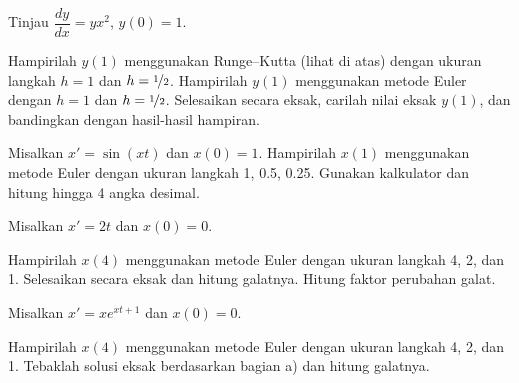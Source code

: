 \begin{exercise}
\pagebreak[2]
Tinjau $\dfrac{dy}{dx} = yx^2$, $y(0)=1$.
\begin{tasks}
\task Hampirilah $y(1)$
menggunakan Runge--Kutta (lihat di atas) dengan ukuran langkah $h=1$ dan
$h=\nicefrac{1}{2}$.
\task Hampirilah $y(1)$ menggunakan metode Euler dengan $h=1$ dan
$h=\nicefrac{1}{2}$.
\task Selesaikan secara eksak, carilah nilai eksak
$y(1)$, dan bandingkan dengan hasil-hasil hampiran.
\end{tasks}
\end{exercise}

\setcounter{exercise}{100}

\begin{exercise}
Misalkan $x' = \sin(xt)$ dan $x(0)=1$.
Hampirilah $x(1)$ menggunakan metode Euler dengan ukuran langkah 1, 0.5, 0.25.
Gunakan kalkulator dan hitung hingga 4 angka desimal.
\end{exercise}

\begin{exercise}
Misalkan $x' = 2t$ dan $x(0)=0$.
\begin{tasks}
\task Hampirilah $x(4)$ menggunakan metode Euler dengan ukuran langkah 4, 2, dan 1.
\task Selesaikan secara eksak dan hitung galatnya.
\task Hitung faktor perubahan galat.
\end{tasks}
\end{exercise}

\begin{samepage}
\begin{exercise}
Misalkan $x' = x e^{xt+1}$ dan $x(0)=0$.
\begin{tasks}
\task Hampirilah $x(4)$ menggunakan metode Euler dengan ukuran langkah 4, 2, dan 1.
\task Tebaklah solusi eksak berdasarkan bagian a) dan hitung galatnya.
\end{tasks}
\end{exercise}
\end{samepage}

